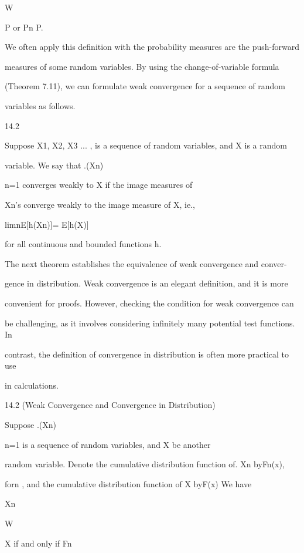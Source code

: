 W

\to P or Pn P.

We often apply this definition with the probability measures are the push-forward

measures of some random variables. By using the change-of-variable formula

(Theorem 7.11), we can formulate weak convergence for a sequence of random

variables as follows.

\begin{defbox}{14.2}
\end{defbox}

Suppose X1, X2, X3 ... , is a sequence of random variables, and X is a random

variable. We say that .(Xn)\infty

n=1 converges weakly to X if the image measures of

Xn's converge weakly to the image measure of X, ie.,

limn\to\infty E[h(Xn)]= E[h(X)]

for all continuous and bounded functions h.

The next theorem establishes the equivalence of weak convergence and conver-

gence in distribution. Weak convergence is an elegant definition, and it is more

convenient for proofs. However, checking the condition for weak convergence can

be challenging, as it involves considering infinitely many potential test functions. In

contrast, the definition of convergence in distribution is often more practical to use

in calculations.

\begin{thmbox}{14.2 (Weak Convergence and Convergence in Distribution)}
\end{thmbox}

Suppose .(Xn)\infty

n=1 is a sequence of random variables, and X be another

random variable. Denote the cumulative distribution function of. Xn byFn(x),

forn , and the cumulative distribution function of X byF(x) We have

Xn

W

\to X if and only if Fn

